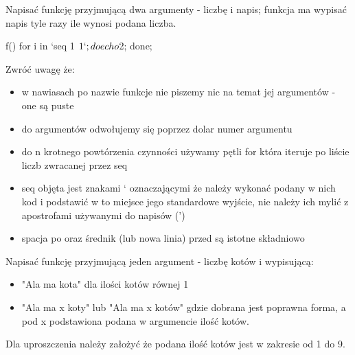\dbEntryCheckResults
Napisać funkcję przyjmującą dwa argumenty - liczbę i napis; funkcja ma wypisać napis tyle razy ile wynosi podana liczba.
\fi
{}\dbEntryCheckResults
\begin{CodeFrame*}[bash]{}
f() { for i in `seq 1 $1`; do echo $2; done; }
\end{CodeFrame*}

\noindent Zwróć uwagę że:
\begin{itemize}
\item w nawiasach po nazwie funkcje nie piszemy nic na temat jej argumentów - one są puste
\item do argumentów odwołujemy się poprzez dolar numer argumentu
\item do n krotnego powtórzenia czynności używamy pętli for która iteruje po liście liczb zwracanej przez seq
\item seq objęta jest znakami ` oznaczającymi że należy wykonać podany w nich kod i podstawić w to miejsce jego standardowe wyjście, nie należy ich mylić z apostrofami używanymi do napisów (')
\item spacja po { oraz średnik (lub nowa linia) przed } są istotne składniowo
\end{itemize}
\fi


\dbEntryCheckResults
Napisać funkcję przyjmującą jeden argument - liczbę kotów i wypisującą:
\begin{itemize}
	\item "Ala ma kota" dla ilości kotów równej 1
	\item "Ala ma x koty" lub "Ala ma x kotów" gdzie dobrana jest poprawna forma, a pod x podstawiona podana w argumencie ilość kotów.
\end{itemize}
Dla uproszczenia należy założyć że podana ilość kotów jest w zakresie od 1 do 9.
\fi
{}\dbEntryCheckResults
{}
\fi
